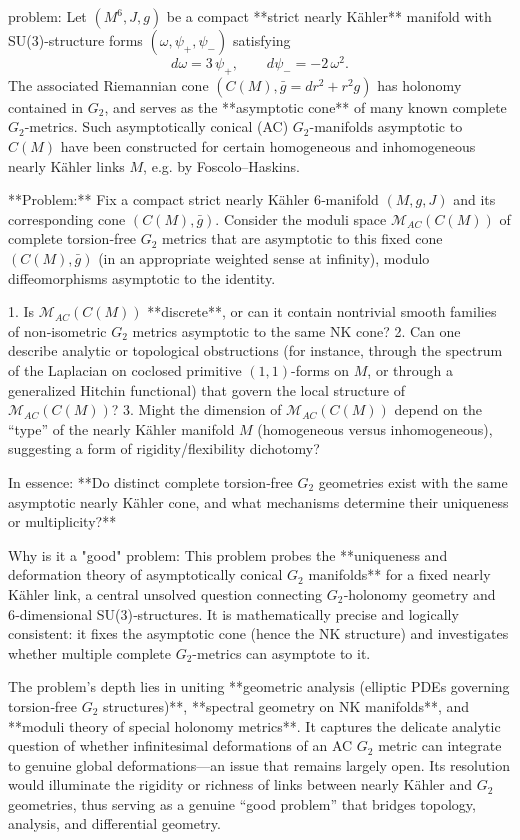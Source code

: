 problem:  
Let \( (M^6, J, g) \) be a compact **strict nearly Kähler** manifold with SU(3)-structure forms \((\omega, \psi_+, \psi_-)\) satisfying  
\[
d\omega = 3\,\psi_+, \qquad d\psi_- = -2\,\omega^2.
\]  
The associated Riemannian cone \( (C(M), \bar g = dr^2 + r^2g) \) has holonomy contained in \( G_2 \), and serves as the **asymptotic cone** of many known complete \(G_2\)-metrics. Such asymptotically conical (AC) \(G_2\)-manifolds asymptotic to \(C(M)\) have been constructed for certain homogeneous and inhomogeneous nearly Kähler links \(M\), e.g. by Foscolo–Haskins.

**Problem:**  
Fix a compact strict nearly Kähler 6‑manifold \((M,g,J)\) and its corresponding cone \((C(M),\bar g)\).  
Consider the moduli space \(\mathcal{M}_{AC}(C(M))\) of complete torsion‑free \(G_2\) metrics that are asymptotic to this fixed cone \((C(M),\bar g)\) (in an appropriate weighted sense at infinity), modulo diffeomorphisms asymptotic to the identity.

1. Is \(\mathcal{M}_{AC}(C(M))\) **discrete**, or can it contain nontrivial smooth families of non‑isometric \(G_2\) metrics asymptotic to the same NK cone?  
2. Can one describe analytic or topological obstructions (for instance, through the spectrum of the Laplacian on coclosed primitive \((1,1)\)-forms on \(M\), or through a generalized Hitchin functional) that govern the local structure of \(\mathcal{M}_{AC}(C(M))\)?  
3. Might the dimension of \(\mathcal{M}_{AC}(C(M))\) depend on the “type” of the nearly Kähler manifold \(M\) (homogeneous versus inhomogeneous), suggesting a form of rigidity/flexibility dichotomy?

In essence: **Do distinct complete torsion‑free \(G_2\) geometries exist with the same asymptotic nearly Kähler cone, and what mechanisms determine their uniqueness or multiplicity?**

Why is it a "good" problem:  
This problem probes the **uniqueness and deformation theory of asymptotically conical \(G_2\) manifolds** for a fixed nearly Kähler link, a central unsolved question connecting \(G_2\)‑holonomy geometry and 6‑dimensional SU(3)‑structures. It is mathematically precise and logically consistent: it fixes the asymptotic cone (hence the NK structure) and investigates whether multiple complete \(G_2\)-metrics can asymptote to it.  

The problem’s depth lies in uniting **geometric analysis (elliptic PDEs governing torsion‑free \(G_2\) structures)**, **spectral geometry on NK manifolds**, and **moduli theory of special holonomy metrics**. It captures the delicate analytic question of whether infinitesimal deformations of an AC \(G_2\) metric can integrate to genuine global deformations—an issue that remains largely open. Its resolution would illuminate the rigidity or richness of links between nearly Kähler and \(G_2\) geometries, thus serving as a genuine “good problem” that bridges topology, analysis, and differential geometry.